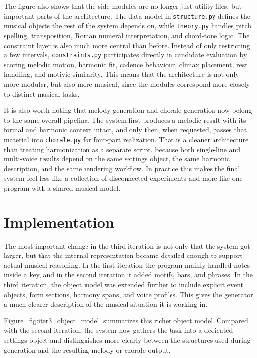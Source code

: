   The figure also shows that the side modules are no longer just utility files, but important parts of the architecture. The data model in \texttt{structure.py} defines the musical objects the rest of the system depends on, while \texttt{theory.py} handles pitch spelling, transposition, Roman numeral interpretation, and chord-tone logic. The constraint layer is also much more central than before. Instead of only restricting a few intervals, \texttt{constraints.py} participates directly in candidate evaluation by scoring melodic motion, harmonic fit, cadence behaviour, climax placement, rest handling, and motivic similarity. This means that the architecture is not only more modular, but also more musical, since the modules correspond more closely to distinct musical tasks.

  It is also worth noting that melody generation and chorale generation now belong to the same overall pipeline. The system first produces a melodic result with its formal and harmonic context intact, and only then, when requested, passes that material into \texttt{chorale.py} for four-part realization. That is a cleaner architecture than treating harmonization as a separate script, because both single-line and multi-voice results depend on the same settings object, the same harmonic description, and the same rendering workflow. In practice this makes the final system feel less like a collection of disconnected experiments and more like one program with a shared musical model.

\section{Implementation}
The most important change in the third iteration is not only that the system got larger, but that the internal representation became detailed enough to support actual musical reasoning. In the first iteration the program mainly handled notes inside a key, and in the second iteration it added motifs, bars, and phrases. In the third iteration, the object model was extended further to include explicit event objects, form sections, harmony spans, and voice profiles. This gives the generator a much clearer description of the musical situation it is working in.

Figure~\ref{fig:iter3_object_model} summarizes this richer object model. Compared with the second iteration, the system now gathers the task into a dedicated settings object and distinguishes more clearly between the structures used during generation and the resulting melody or chorale output.

